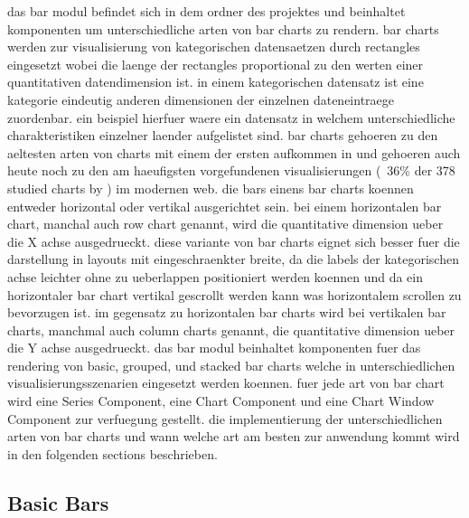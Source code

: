 das bar modul befindet sich in dem  ordner des projektes und beinhaltet komponenten um unterschiedliche arten von bar charts zu rendern.
bar charts werden zur visualisierung von kategorischen datensaetzen durch rectangles eingesetzt wobei die laenge der rectangles proportional zu den werten einer quantitativen datendimension ist.
in einem kategorischen datensatz ist eine kategorie eindeutig anderen dimensionen der einzelnen dateneintraege zuordenbar.
ein beispiel hierfuer waere ein datensatz in welchem unterschiedliche charakteristiken einzelner laender aufgelistet sind.
bar charts gehoeren zu den aeltesten arten von charts mit einem der ersten aufkommen in \textcite{CommercialAndPoliticalAtlas} und gehoeren auch heute noch zu den am haeufigsten vorgefundenen visualisierungen (~36\% der 378 studied charts by \textcite{DesignPatternsTradeOffsRespVisGallery}) im modernen web.
die bars einens bar charts koennen entweder horizontal oder vertikal ausgerichtet sein.
bei einem horizontalen bar chart, manchal auch row chart genannt, wird die quantitative dimension ueber die X achse ausgedrueckt.
diese variante von bar charts eignet sich besser fuer die darstellung in layouts mit eingeschraenkter breite, da die labels der kategorischen achse leichter ohne zu ueberlappen positioniert werden koennen und da ein horizontaler bar chart vertikal gescrollt werden kann was horizontalem scrollen zu bevorzugen ist.
im gegensatz zu horizontalen bar charts wird bei vertikalen bar charts, manchmal auch column charts genannt, die quantitative dimension ueber die Y achse ausgedrueckt. 
das bar modul beinhaltet komponenten fuer das rendering von basic, grouped, und stacked bar charts welche in unterschiedlichen visualisierungsszenarien eingesetzt werden koennen.
fuer jede art von bar chart wird eine Series Component, eine Chart Component und eine Chart Window Component zur verfuegung gestellt. 
die implementierung der unterschiedlichen arten von bar charts und wann welche art am besten zur anwendung kommt wird in den folgenden sections beschrieben.

\subsection{Basic Bars}



